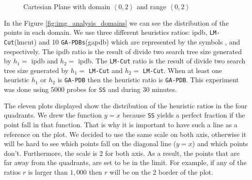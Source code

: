 \begin{figure}[!htb]
\centering  
{}
  \caption{Cartesian Plane with domain $\left\langle 0, 2\right\rangle$ and range $\left\langle 0, 2\right\rangle$ }\label{fig:img_cartesian_plane}
\end{figure}

In the Figure \ref{fig:img_analysis_domains} we can see the distribution of the points in each domain. We use three different heuristics ratios: ipdb, \texttt{LM-Cut}(lmcut) and 10 \texttt{GA-PDBs}(gapdb) which are represented by the symbols  ,  and  respectively. The ipdb ratio is the result of divide two search tree size generated by $h_{1} =$ ipdb and $h_{2} =$ ipdb. The \texttt{LM-Cut} ratio is the result of divide two search tree size generated by $h_{1} =$ \texttt{LM-Cut} and $h_{2} =$  \texttt{LM-Cut}. When at least one heuristic $h_{1}$ or $h_{2}$ is \texttt{GA-PDB} then the heuristic ratio is \texttt{GA-PDB}. This experiment was done using 5000 probes for \texttt{SS} and during 30 minutes.

The eleven plots displayed show the distribution of the heuristic ratios in the four quadrants. We drew the function $y = x$ because \texttt{SS} yields a perfect fraction if the point fall in that function. That is why it is important to have such a line as a reference on the plot. We decided to use the same scale on both axis, otherwise it will be hard to see which points fall on the diagonal line ($y = x$) and which points don't. Furthermore, the scale is $2$ for both axis. As a result, the points that are far away from the quadrants, are set to be in the limit. For example, if any of the ratios $r$ is larger than $1,000$ then $r$ will be on the $2$ border of the plot.

